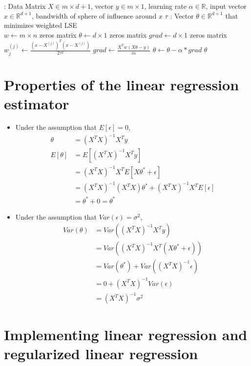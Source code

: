 \documentclass[pdftex,11pt]{article}
\begin{document}
\begin{itemize}
\begin{algorithm}
  \begin{algorithmic}
  	: Data Matrix $X \in m\times d+1$, vector $y\in m\times 1$, learning rate $\alpha\in \mathbb{R}$, input vector $x\in\mathbb{R}^{d+1}$, bandwidth of sphere of influence around $x$ $\tau$
	: Vector $\theta\in\mathbb{R}^{d+1}$ that minimizes weighted LSE\\
	\State $w\gets m\times n$ zeros matrix
	\State $\theta\gets d\times 1$ zeros matrix
	\State $grad\gets d\times 1$ zeros matrix
	\State $w_j^{(j)}\gets\frac{(x-X^{(j)})^T(x-X^{(j)})}{2\tau^2}$
	\EndFor
	 
	\State $grad\gets\frac{X^Tw(X\theta-y)}{m}$
	\State $\theta\gets\theta-\alpha*grad$
	\EndFor
	\State \Return $\theta$
  \end{algorithmic}
\end{algorithm}
\end{itemize}

\section{Properties of the linear regression estimator}
\begin{itemize}
\item Under the assumption that $E[\epsilon]=0$,
	\begin{align*}
		\theta&=(X^TX)^{-1}X^Ty\\
		E[\theta]&=E[(X^TX)^{-1}X^Ty]\\
		&=(X^TX)^{-1}X^TE[X\theta^*+\epsilon]\\
		&=(X^TX)^{-1}(X^TX)\theta^*+(X^TX)^{-1}X^TE[\epsilon]\\
		&=\theta^*+0=\theta^*
	\end{align*}
\item Under the assumption that $Var(\epsilon)=\sigma^2$,
	\begin{align*}
		Var(\theta)&=Var((X^TX)^{-1}X^Ty)\\
		&=Var((X^TX)^{-1}X^T(X\theta^*+\epsilon))\\
		&=Var(\theta^*)+Var((X^TX)^{-1}\epsilon)\\
		&=0+(X^TX)^{-1}Var(\epsilon)\\
		&=(X^TX)^{-1}\sigma^2
	\end{align*}
\end{itemize}

\section{Implementing linear regression and regularized linear regression}
\end{document}
